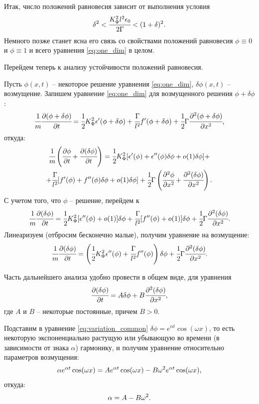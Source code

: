 Итак, число положений равновесия зависит от выполнения условия
\begin{equation}
	\delta^2 < \cfrac{K_\Phi^2 l^2 \epsilon_0}{2 \Gamma} < (1 + \delta)^2 {\text{.}}
	\label{cond:equilibriums_number}
\end{equation}
Немного позже станет ясна его связь со свойствами положений равновесия $\phi \equiv 0$ и $\phi \equiv 1$ и всего уравнения \eqref{eq:one_dim} в целом.

Перейдем теперь к анализу устойчивости положений равновесия.

Пусть $\phi(x, t)$ -- некоторое решение уравнения \eqref{eq:one_dim}, $\delta \phi(x, t)$ -- возмущение. Запишем уравнение \eqref{eq:one_dim} для возмущенного решения $\phi + \delta \phi$:
$$\cfrac{1}{m} \cfrac{\partial (\phi + \delta \phi)}{\partial t} = \cfrac{1}{2} K_\Phi^2 \epsilon'(\phi + \delta \phi) + \cfrac{\Gamma}{l^2} f'(\phi + \delta \phi) + \cfrac{1}{2} \Gamma \cfrac{\partial^2 (\phi + \delta \phi)}{\partial x^2} {\text{,}}$$
откуда:
\begin{multline*}
	\cfrac{1}{m} \left( \cfrac{\partial \phi}{\partial t} + \cfrac{\partial (\delta \phi)}{\partial t} \right) = \cfrac{1}{2} K_\Phi^2 [\epsilon'(\phi) + \epsilon''(\phi) \delta \phi + o(1) \delta \phi] + \\ + \cfrac{\Gamma}{l^2} [f'(\phi) + f''(\phi) \delta \phi + o(1) \delta \phi] + \cfrac{1}{2} \Gamma \left( \cfrac{\partial^2 \phi}{\partial x^2} + \cfrac{\partial^2 (\delta \phi)}{\partial x^2} \right) {\text{.}}
\end{multline*}
С учетом того, что $\phi$ -- решение, перейдем к
$$\cfrac{1}{m} \cfrac{\partial (\delta \phi)}{\partial t} = \cfrac{1}{2} K_\Phi^2 [\epsilon''(\phi) + o(1)] \delta \phi + \cfrac{\Gamma}{l^2} [f''(\phi) + o(1)] \delta \phi + \cfrac{1}{2} \Gamma \cfrac{\partial^2 (\delta \phi)}{\partial x^2} {\text{.}}$$
Линеаризуем (отбросим бесконечно малые), получим уравнение на возмущение:
\begin{equation}
	\cfrac{1}{m} \cfrac{\partial (\delta \phi)}{\partial t} = \left(\cfrac{1}{2} K_\Phi^2 \epsilon''(\phi) + \cfrac{\Gamma}{l^2} f''(\phi) \right) \delta \phi + \cfrac{1}{2} \Gamma \cfrac{\partial^2 (\delta \phi)}{\partial x^2} {\text{.}}
	\label{eq:variation}
\end{equation}

Часть дальнейшего анализа удобно провести в общем виде, для уравнения
\begin{equation}
	\cfrac{\partial (\delta \phi)}{\partial t} = A \delta \phi + B \cfrac{\partial^2 (\delta \phi)}{\partial x^2} {\text{,}}
	\label{eq:variation_common}
\end{equation}
где $A$ и $B$ -- некоторые постоянные, причем $B > 0$.

Подставим в уравнение \eqref{eq:variation_common} $\delta \phi = e^{\alpha t} \cos(\omega x)$, то есть некоторую экспоненциально растущую или убывающую во времени (в зависимости от знака $\alpha$) гармонику, и получим уравнение относительно параметров возмущения:
$$\alpha e^{\alpha t} \cos(\omega x) = A e^{\alpha t} \cos(\omega x) - B \omega^2 e^{\alpha t} \cos(\omega x) {\text{,}}$$
откуда:
\begin{equation}
	\alpha = A - B \omega^2 {\text{.}}
	\label{eq:exponent_coefficient}
\end{equation}

